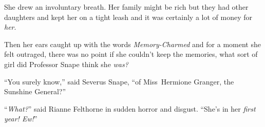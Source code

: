 She drew an involuntary breath. Her family might be rich but they had other daughters and kept her on a tight leash and it was certainly a lot of money for \emph{her}.

Then her ears caught up with the words \emph{Memory-Charmed} and for a moment she felt outraged, there was no point if she couldn’t keep the memories, what sort of girl did Professor Snape think she \emph{was?}

“You surely know,” said Severus Snape, “of Miss~Hermione Granger, the Sunshine General?”

“\emph{What?}” said Rianne Felthorne in sudden horror and disgust. “She’s in her \emph{first year! Ew!}”

